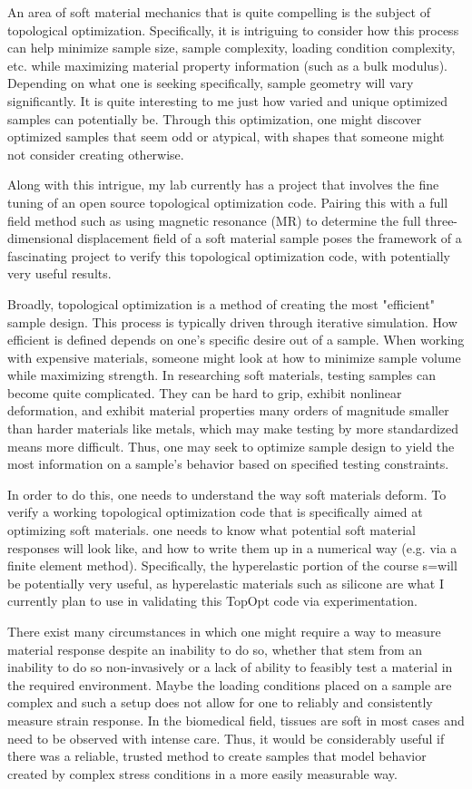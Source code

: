 An area of soft material mechanics that is quite compelling is the subject of topological optimization. Specifically, it is intriguing to consider how this process can help minimize sample size, sample complexity, loading condition complexity, etc. while maximizing material property information (such as a bulk modulus). Depending on what one is seeking specifically, sample geometry will vary significantly. It is quite interesting to me just how varied and unique optimized samples can potentially be. Through this optimization, one might discover optimized samples that seem odd or atypical, with shapes that someone might not consider creating otherwise.

Along with this intrigue, my lab currently has a project that involves the fine tuning of an open source topological optimization code. Pairing this with a full field method such as using magnetic resonance (MR) to determine the full three-dimensional displacement field of a soft material sample poses the framework of a fascinating project to verify this topological optimization code, with potentially very useful results.

Broadly, topological optimization is a method of creating the most "efficient" sample design. This process is typically driven through iterative simulation. How efficient is defined depends on one's specific desire out of a sample. When working with expensive materials, someone might look at how to minimize sample volume while maximizing strength. In researching soft materials, testing samples can become quite complicated. They can be hard to grip, exhibit nonlinear deformation, and exhibit material properties many orders of magnitude smaller than harder materials like metals, which may make testing by more standardized means more difficult. Thus, one may seek to optimize sample design to yield the most information on a sample's behavior based on specified testing constraints.

In order to do this, one needs to understand the way soft materials deform. To verify a working topological optimization code that is specifically aimed at optimizing soft materials. one needs to know what potential soft material responses will look like, and how to write them up in a numerical way (e.g. via a finite element method). Specifically, the hyperelastic portion of the course s=will be potentially very useful, as hyperelastic materials such as silicone are what I currently plan to use in validating this TopOpt code via experimentation.

There exist many circumstances in which one might require a way to measure material response despite an inability to do so, whether that stem from an inability to do so non-invasively or a lack of ability to feasibly test a material in the required environment. Maybe the loading conditions placed on a sample are complex and such a setup does not allow for one to reliably and consistently measure strain response. In the biomedical field, tissues are soft in most cases and need to be observed with intense care. Thus, it would be considerably useful if there was a reliable, trusted method to create samples that model behavior created by complex stress conditions in a more easily measurable way.

